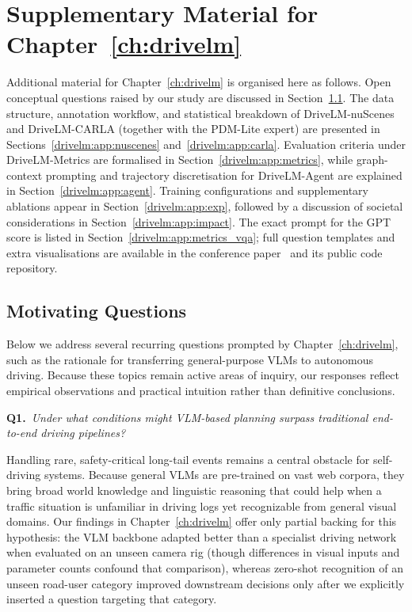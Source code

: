 \chapter{Supplementary Material for Chapter~\ref{ch:drivelm}}\label{app:drivelm}

Additional material for Chapter~\ref{ch:drivelm} is organised here as follows. Open conceptual questions raised by our study are discussed in Section~\ref{drivelm:app:questions}. The data structure, annotation workflow, and statistical breakdown of DriveLM-nuScenes and DriveLM-CARLA (together with the PDM-Lite expert) are presented in Sections~\ref{drivelm:app:nuscenes} and~\ref{drivelm:app:carla}. Evaluation criteria under DriveLM-Metrics are formalised in Section~\ref{drivelm:app:metrics}, while graph-context prompting and trajectory discretisation for DriveLM-Agent are explained in Section~\ref{drivelm:app:agent}. Training configurations and supplementary ablations appear in Section~\ref{drivelm:app:exp}, followed by a discussion of societal considerations in Section~\ref{drivelm:app:impact}. The exact prompt for the GPT score is listed in Section~\ref{drivelm:app:metrics_vqa}; full question templates and extra visualisations are available in the conference paper~\cite{sima2024drivelm} and its public code repository.

\section{Motivating Questions}\label{drivelm:app:questions}

Below we address several recurring questions prompted by Chapter~\ref{ch:drivelm}, such as the rationale for transferring general-purpose VLMs to autonomous driving. Because these topics remain active areas of inquiry, our responses reflect empirical observations and practical intuition rather than definitive conclusions.

\medskip\noindent\textbf{Q1.}~\emph{Under what conditions might VLM-based planning surpass traditional end-to-end driving pipelines?}

\noindent Handling rare, safety-critical long-tail events remains a central obstacle for self-driving systems. Because general VLMs are pre-trained on vast web corpora, they bring broad world knowledge and linguistic reasoning that could help when a traffic situation is unfamiliar in driving logs yet recognizable from general visual domains. Our findings in Chapter~\ref{ch:drivelm} offer only partial backing for this hypothesis: the VLM backbone adapted better than a specialist driving network when evaluated on an unseen camera rig (though differences in visual inputs and parameter counts confound that comparison), whereas zero-shot recognition of an unseen road-user category improved downstream decisions only after we explicitly inserted a question targeting that category.

